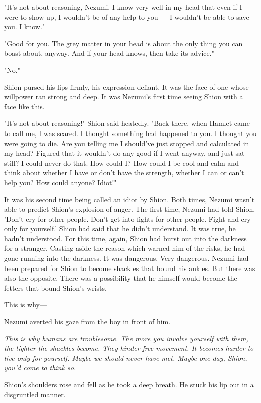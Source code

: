"It's not about reasoning, Nezumi. I know very well in my head that even
if I were to show up, I wouldn't be of any help to you --- I wouldn't be
able to save you. I know."

"Good for you. The grey matter in your head is about the only thing you
can boast about, anyway. And if your head knows, then take its advice."

"No."

Shion pursed his lips firmly, his expression defiant. It was the face of
one whose willpower ran strong and deep. It was Nezumi's first time
seeing Shion with a face like this.

"It's not about reasoning!" Shion said heatedly. "Back there, when
Hamlet came to call me, I was scared. I thought something had happened
to you. I thought you were going to die. Are you telling me I should've
just stopped and calculated in my head? Figured that it wouldn't do any
good if I went anyway, and just sat still? I could never do that. How
could I? How could I be cool and calm and think about whether I have or
don't have the strength, whether I can or can't help you? How could
anyone? Idiot!"

It was his second time being called an idiot by Shion. Both times,
Nezumi wasn't able to predict Shion's explosion of anger. The first
time, Nezumi had told Shion, 'Don't cry for other people. Don't get into
fights for other people. Fight and cry only for yourself.' Shion had
said that he didn't understand. It was true, he hadn't understood. For
this time, again, Shion had burst out into the darkness for a stranger.
Casting aside the reason which warned him of the risks, he had gone
running into the darkness. It was dangerous. Very dangerous. Nezumi had
been prepared for Shion to become shackles that bound his ankles. But
there was also the opposite. There was a possibility that he himself
would become the fetters that bound Shion's wrists.

This is why---

Nezumi averted his gaze from the boy in front of him.

\emph{This is why humans are troublesome. The more you involve yourself with
them, the tighter the shackles become. They hinder free movement. It
becomes harder to live only for yourself. Maybe we should never have
met. Maybe one day, Shion, you'd come to think so.}

Shion's shoulders rose and fell as he took a deep breath. He stuck his
lip out in a disgruntled manner.

